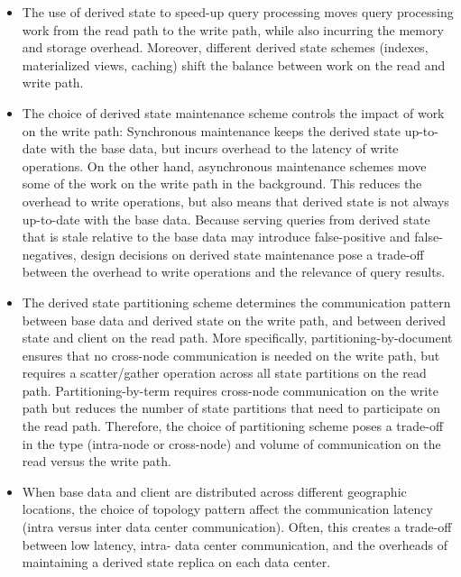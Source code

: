 \begin{itemize}
  \item The use of derived state to speed-up query processing moves query processing work from the read path to the write
  path, while also incurring the memory and storage overhead.
  Moreover, different derived state schemes (indexes, materialized views, caching) shift the balance between work
  on the read and write path.

  \item The choice of derived state maintenance scheme controls the impact of work on the write path:
  Synchronous maintenance keeps the derived state up-to-date with the base data,
  but incurs overhead to the latency of write operations.
  On the other hand, asynchronous maintenance schemes move some of the work on the write path in the background.
  This reduces the overhead to write operations, but also means that derived state is not always up-to-date with the base
  data.
  Because serving queries from derived state that is stale relative to the base data may introduce false-positive and
  false-negatives,
  design decisions on derived state maintenance pose a trade-off between the overhead to write operations
  and the relevance of query results.

  \item The derived state partitioning scheme determines the communication pattern between base data and derived state
  on the write path, and between derived state and client on the read path.
  More specifically, partitioning-by-document ensures that no cross-node communication is needed on the write path,
  but requires a scatter/gather operation across all state partitions on the read path.
  Partitioning-by-term requires cross-node communication on the write path but reduces the number of state partitions
  that need to participate on the read path.
  Therefore, the choice of partitioning scheme poses a trade-off in the type (intra-node or cross-node) and volume
  of communication on the read versus the write path.

  \item When base data and client are distributed across different geographic locations,
  the choice of topology pattern affect the communication latency (intra versus inter data center communication).
  Often, this creates a trade-off between low latency, intra- data center communication, and the overheads of
  maintaining a derived state replica on each data center.

\end{itemize}





